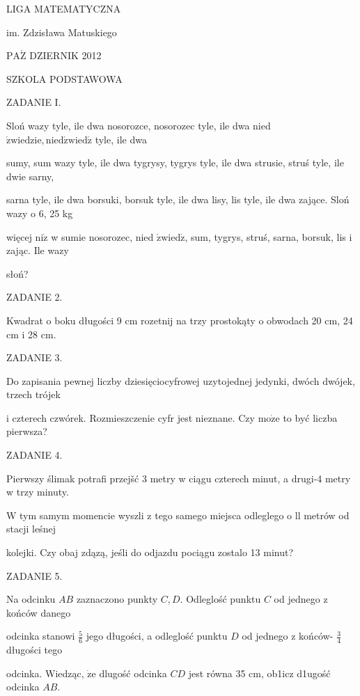 \documentclass[a4paper,12pt]{article}
\begin{document}
LIGA MATEMATYCZNA

im. Zdzisława Matuskiego

$\mathrm{P}\mathrm{A}\acute{\mathrm{Z}}$ DZIERNIK 2012

SZKOLA PODSTAWOWA

ZADANIE I.

Sloń wazy tyle, ile dwa nosorozce, nosorozec tyle, ile dwa nied $\acute{\mathrm{z}}\mathrm{w}\mathrm{i}\mathrm{e}\mathrm{d}\mathrm{z}\mathrm{i}\mathrm{e}, \mathrm{n}\mathrm{i}\mathrm{e}\mathrm{d}\acute{\mathrm{z}}\mathrm{w}\mathrm{i}\mathrm{e}\mathrm{d}\acute{\mathrm{z}}$ tyle, ile dwa

sumy, sum wazy tyle, ile dwa tygrysy, tygrys tyle, ile dwa strusie, struś tyle, ile dwie sarny,

sarna tyle, ile dwa borsuki, borsuk tyle, ile dwa lisy, lis tyle, ile dwa zające. Sloń wazy o 6, 25 kg

więcej $\mathrm{n}\mathrm{i}\dot{\mathrm{z}}$ w sumie nosorozec, nied $\acute{\mathrm{z}}\mathrm{w}\mathrm{i}\mathrm{e}\mathrm{d}\acute{\mathrm{z}}$, sum, tygrys, struś, sarna, borsuk, lis i zając. Ile wazy

słoń?

ZADANIE 2.

Kwadrat o boku długości 9 cm rozetnij na trzy prostokąty o obwodach 20 cm, 24 cm i 28 cm.

ZADANIE 3.

Do zapisania pewnej liczby dziesięciocyfrowej uzytojednej jedynki, dwóch dwójek, trzech trójek

i czterech czwórek. Rozmieszczenie cyfr jest nieznane. Czy $\mathrm{m}\mathrm{o}\dot{\mathrm{z}}\mathrm{e}$ to być liczba pierwsza?

ZADANIE 4.

Pierwszy ślimak potrafi przejšć 3 metry w ciągu czterech minut, a drugi-4 metry w trzy minuty.

W tym samym momencie wyszli z tego samego miejsca odleglego o ll metrów od stacji leśnej

kolejki. Czy obaj zdązą, jeśli do odjazdu pociągu zostalo 13 minut?

ZADANIE 5.

Na odcinku $AB$ zaznaczono punkty $C, D$. Odleglość punktu $C$ od jednego z końców danego

odcinka stanowi $\displaystyle \frac{5}{6}$ jego długości, a odleglość punktu $D$ od jednego z końców- $\displaystyle \frac{3}{4}$ długości tego

odcinka. Wiedząc, $\dot{\mathrm{z}}\mathrm{e}$ dlugość odcinka $CD$ jest równa 35 cm, ob1icz d1ugość odcinka $AB.$
\end{document}
